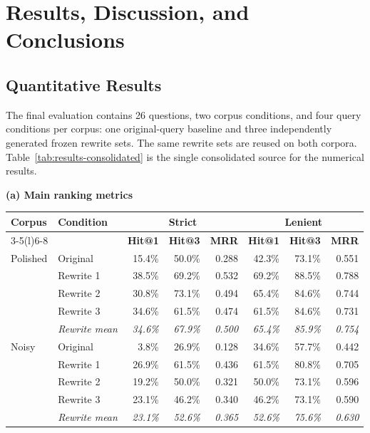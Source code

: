 \chapter{Results, Discussion, and Conclusions}

\section{Quantitative Results}

The final evaluation contains 26 questions, two corpus conditions, and four query conditions per corpus: one original-query baseline and three independently generated frozen rewrite sets. The same rewrite sets are reused on both corpora. Table~\ref{tab:results-consolidated} is the single consolidated source for the numerical results.

\begin{table}[htbp]
\centering
\small
\setlength{\tabcolsep}{4.5pt}
\textbf{(a) Main ranking metrics}\\[0.35em]
\begin{tabular}{@{}llrrrrrr@{}}
\toprule
\textbf{Corpus} & \textbf{Condition} & \multicolumn{3}{c}{\textbf{Strict}} & \multicolumn{3}{c}{\textbf{Lenient}} \\
\cmidrule(lr){3-5}\cmidrule(l){6-8}
& & \textbf{Hit@1} & \textbf{Hit@3} & \textbf{MRR} & \textbf{Hit@1} & \textbf{Hit@3} & \textbf{MRR} \\
\midrule
Polished & Original & 15.4\% & 50.0\% & 0.288 & 42.3\% & 73.1\% & 0.551 \\
& Rewrite 1 & 38.5\% & 69.2\% & 0.532 & 69.2\% & 88.5\% & 0.788 \\
& Rewrite 2 & 30.8\% & 73.1\% & 0.494 & 65.4\% & 84.6\% & 0.744 \\
& Rewrite 3 & 34.6\% & 61.5\% & 0.474 & 61.5\% & 84.6\% & 0.731 \\
& \emph{Rewrite mean} & \emph{34.6\%} & \emph{67.9\%} & \emph{0.500} & \emph{65.4\%} & \emph{85.9\%} & \emph{0.754} \\
\midrule
Noisy & Original & 3.8\% & 26.9\% & 0.128 & 34.6\% & 57.7\% & 0.442 \\
& Rewrite 1 & 26.9\% & 61.5\% & 0.436 & 61.5\% & 80.8\% & 0.705 \\
& Rewrite 2 & 19.2\% & 50.0\% & 0.321 & 50.0\% & 73.1\% & 0.596 \\
& Rewrite 3 & 23.1\% & 46.2\% & 0.340 & 46.2\% & 73.1\% & 0.590 \\
& \emph{Rewrite mean} & \emph{23.1\%} & \emph{52.6\%} & \emph{0.365} & \emph{52.6\%} & \emph{75.6\%} & \emph{0.630} \\
\bottomrule
\end{tabular}


\end{table}
